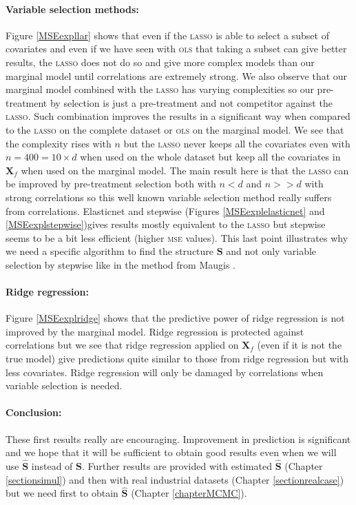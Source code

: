 \documentclass[12pt,a4paper]{report}
\begin{document}
\paragraph{Variable selection methods:} Figure \ref{MSEexpllar} shows that even if the \textsc{lasso} is able to select a subset of covariates and even if we have seen with \textsc{ols} that taking a subset can give better results, the \textsc{lasso} does not do so and give more complex models than our marginal model until correlations are extremely strong. We also observe that our marginal model combined with the \textsc{lasso} has varying complexities so our pre-treatment by selection is just a pre-treatment and not competitor against the \textsc{lasso}. Such combination improves the results in a significant way when compared to the \textsc{lasso} on the complete dataset or \textsc{ols} on the marginal model. We see that the complexity rises with $n$ but the \textsc{lasso} never keeps all the covariates even with $n=400=10\times d$ when used on the whole dataset but keep all the covariates in $\boldsymbol{X}_f$ when used on the marginal model. The main result here is that the \textsc{lasso} can be improved by pre-treatment selection both with $n<d$ and $n>>d$ with strong correlations so this well known variable selection method really suffers from correlations. Elasticnet and stepwise (Figures \ref{MSEexplelasticnet} and \ref{MSEexplstepwise})gives results mostly equivalent to the \textsc{lasso} but stepwise seems to be a bit less efficient (higher \textsc{mse} values). This last point illustrates why we need a specific algorithm to find the structure $\boldsymbol{S}$ and not only variable selection by stepwise like in the method from Maugis \cite{maugis2009variable}. \\

\paragraph{Ridge regression:} Figure \ref{MSEexplridge} shows that the predictive power of ridge regression is not improved by the marginal model. Ridge regression is protected against correlations but we see that ridge regression applied on $\boldsymbol{X}_f$ (even if it is not the true model) give predictions quite similar to those from ridge regression but with less covariates. Ridge regression will only be damaged by correlations when variable selection is needed. \\


	\FloatBarrier
\paragraph{Conclusion:}
These first results really are encouraging. Improvement in prediction is significant and we hope that it will be sufficient to obtain good results even when we will use $\hat{\boldsymbol{S}}$ instead of $\boldsymbol{S}$. Further results are provided  with estimated $\hat{\boldsymbol{S}}$ (Chapter \ref{sectionsimul}) and then with real industrial datasets (Chapter \ref{sectionrealcase}) but we need first to obtain $\hat{\boldsymbol{S}}$ (Chapter  \ref{chapterMCMC}).
\newpage
\end{document}
